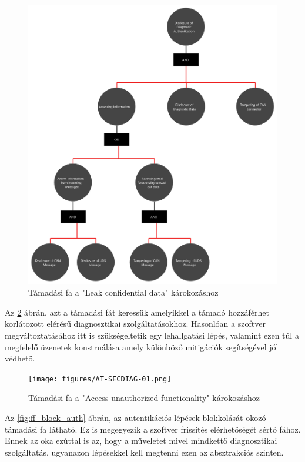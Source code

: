 \begin{figure}[!ht]
	\centering
	\includegraphics[width=120mm, keepaspectratio]{figures/AT-SECDIAG-00.png}
	\caption{Támadási fa a "Leak confidential data" károkozáshoz} 
	\label{fig:ff_leak_data}
\end{figure}

\newpage

Az \ref{fig:ff_access} ábrán, azt a támadási fát keressük amelyikkel a támadó hozzáférhet korlátozott elérésű diagnosztikai szolgáltatásokhoz. Hasonlóan a szoftver megváltoztatásához itt is szükségeltetik egy lehallgatási lépés, valamint ezen túl a megfelelő üzenetek konstruálása amely különböző mitigációk segítségével jól védhető.

\begin{figure}[!ht]
	\centering
	\texttt{[image: figures/AT-SECDIAG-01.png]}
	\caption{Támadási fa a "Access unauthorized functionality" károkozáshoz} 
	\label{fig:ff_access}
\end{figure}

\newpage

Az \ref{fig:ff_block_auth} ábrán, az autentikációs lépések blokkolását okozó támadási fa látható. Ez is megegyezik a szoftver frissítés elérhetőségét sértő fához. Ennek az oka ezúttal is az, hogy a műveletet mivel mindkettő diagnosztikai szolgáltatás, ugyanazon lépésekkel kell megtenni ezen az absztrakciós szinten.

